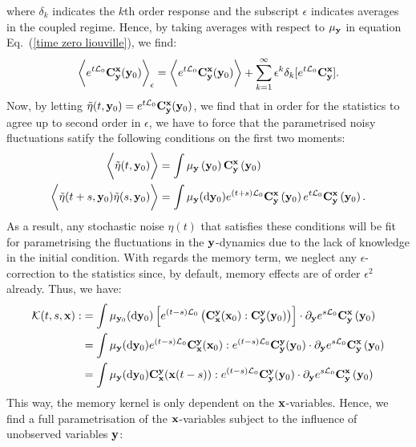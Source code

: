 \documentclass[12pt]{article}
\begin{document}
where $\delta_k$ indicates the $k$th order response and the subscript $\epsilon$ indicates averages in the coupled regime. Hence, by taking averages with respect to $\mu_{\mathbf{y}}$ in equation Eq.~(\ref{time zero liouville}), we find:
\begin{equation}
	\bigg\langle  e^{t\mathcal{L}_0}\mathbf{C}_{\mathbf{y}}^{\mathbf{x}}(\mathbf{y}_0) \bigg \rangle_{\epsilon} = \bigg\langle  e^{t\mathcal{L}_0}\mathbf{C}_{\mathbf{y}}^{\mathbf{x}}(\mathbf{y}_0) \bigg \rangle + \sum_{k=1}^{\infty}\epsilon ^{k}\delta_k [e^{t\mathcal{L}_0}\mathbf{C}^{\mathbf{x}}_{\mathbf{y}}].
\end{equation}
Now, by letting $\tilde{\eta}(t,\mathbf{y}_0)= e^{t\mathcal{L}_0}\mathbf{C}_{\mathbf{y}}^{\mathbf{x}}(\mathbf{y}_0)$, we find that in order for the statistics to agree up to second order in $\epsilon$, we have to force that the parametrised noisy fluctuations satify the following conditions on the first two moments:
\begin{align}\label{moments1}
	\bigg \langle \tilde{\eta}(t,\mathbf{y}_0) \bigg \rangle &= \int \mu_{\mathbf{y}}\left(\mathbf{y}_0\right)\mathbf{C}_{\mathbf{y}}^{\mathbf{x}}\left(\mathbf{y}_0 \right) \\\label{moments2}
	\bigg \langle \tilde{\eta}(t+s,\mathbf{y}_0)\tilde{\eta}(s,\mathbf{y}_0) \bigg \rangle &= \int \mu_{\mathbf{y}}(\mathrm{d} \mathbf{y}_0) e^{(t+s)\mathcal{L}_0}\mathbf{C}_{\mathbf{y}}^{\mathbf{x}}\left(\mathbf{y}_0 \right)e^{t\mathcal{L}_0}\mathbf{C}_{\mathbf{y}}^{\mathbf{x}}\left(\mathbf{y}_0 \right).
\end{align}
As a result, any stochastic noise $\eta(t)$ that satisfies these conditions will be fit for parametrising the fluctuations in the $\mathbf{y}$-dynamics due to the lack of knowledge in the initial condition. With regards the memory term, we neglect any $\epsilon$-correction to the statistics since, by default, memory effects are of order $\epsilon ^2$ already. Thus, we have:
\begin{align}
	\mathcal{K}(t,s,\mathbf{x}):&=\int \mu _{\mathbf{y}_0}(\mathrm{d} \mathbf{y}_0) \left[e^{(t-s)\mathcal{L}_0} \left(\mathbf{C}_{\mathbf{x}}^{\mathbf{y}}(\mathbf{x}_0):\mathbf{C}_{\mathbf{y}}^{\mathbf{y}}(\mathbf{y}_0)  \right)\right]\cdot \partial _{\mathbf{y}}e^{s\mathcal{L}_0}\mathbf{C}_{\mathbf{y}}^{\mathbf{x}}\left(\mathbf{y}_0 \right) \\&= \int \mu _{\mathbf{y}}(\mathrm{d} \mathbf{y}_0)e^{(t-s)\mathcal{L}_0} \mathbf{C}_{\mathbf{x}}^{\mathbf{y}}(\mathbf{x}_0): e^{(t-s)\mathcal{L}_0}\mathbf{C}_{\mathbf{y}}^{\mathbf{y}}(\mathbf{y}_0) \cdot \partial _{\mathbf{y}}e^{s\mathcal{L}_0}\mathbf{C}_{\mathbf{y}}^{\mathbf{x}}\left(\mathbf{y}_0 \right) \\ & =
	\int \mu _{\mathbf{y}}(\mathrm{d} \mathbf{y}_0) \mathbf{C}_{\mathbf{x}}^{\mathbf{y}}(\mathbf{x}(t-s)): e^{(t-s)\mathcal{L}_0}\mathbf{C}_{\mathbf{y}}^{\mathbf{y}}(\mathbf{y}_0) \cdot \partial _{\mathbf{y}}e^{s\mathcal{L}_0}\mathbf{C}_{\mathbf{y}}^{\mathbf{x}}\left(\mathbf{y}_0 \right)
\end{align}
This way, the memory kernel is only dependent on the $\mathbf{x}$-variables. Hence, we find a full parametrisation of the $\mathbf{x}$-variables subject to the influence of unobserved variables $\mathbf{y}$:
\end{document}
